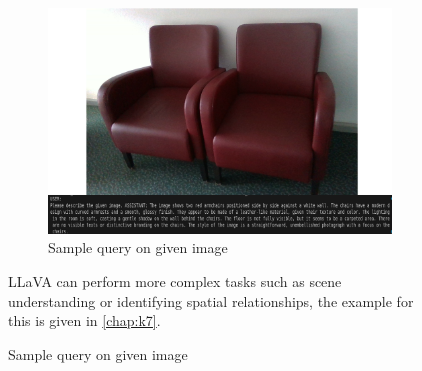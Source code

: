 \begin{figure}[ht!]
\begin{figure}[ht!]
    \centering
    \includegraphics[width=\textwidth]{content/images/theory/LLaVA.png}
    \caption{Sample query on given image \cite{cheng2024yolow}}
    \label{fig:llava}
\end{figure}
 LLaVA can perform more complex tasks such as scene understanding or identifying spatial relationships, the example for this is given in \cref{chap:k7}.


\end{figure}
